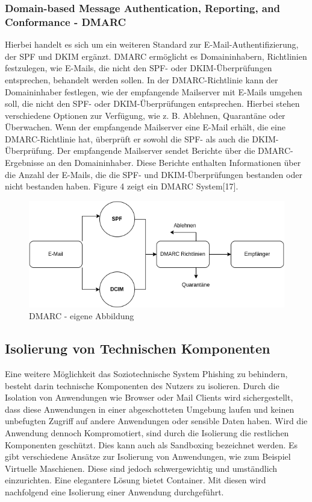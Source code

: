 \documentclass[journal=tosc,final]{iacrtrans}
\begin{document}
 \subsubsection{Domain-based Message Authentication, Reporting, and Conformance - DMARC}
 Hierbei handelt es sich um ein weiteren Standard zur E-Mail-Authentifizierung, der SPF und DKIM ergänzt. DMARC ermöglicht es Domaininhabern, Richtlinien festzulegen, wie E-Mails, die nicht den SPF- oder DKIM-Überprüfungen entsprechen, behandelt werden sollen. In der DMARC-Richtlinie kann der Domaininhaber festlegen, wie der empfangende Mailserver mit E-Mails umgehen soll, die nicht den SPF- oder DKIM-Überprüfungen entsprechen. Hierbei stehen verschiedene Optionen zur Verfügung, wie z. B. Ablehnen, Quarantäne oder Überwachen. Wenn der empfangende Mailserver eine E-Mail erhält, die eine DMARC-Richtlinie hat, überprüft er sowohl die SPF- als auch die DKIM-Überprüfung. Der empfangende Mailserver sendet Berichte über die DMARC-Ergebnisse an den Domaininhaber. Diese Berichte enthalten Informationen über die Anzahl der E-Mails, die die SPF- und DKIM-Überprüfungen bestanden oder nicht bestanden haben. Figure 4 zeigt ein DMARC System[17].
 \begin{figure}[h]
  \caption{DMARC - eigene Abbildung}
  \centering \includegraphics[scale=0.5]{dmarc.png}
 \end{figure}
\newpage
\subsection{Isolierung von Technischen Komponenten}
Eine weitere Möglichkeit das Soziotechnische System Phishing zu behindern, besteht darin technische Komponenten des Nutzers zu isolieren. Durch die Isolation von Anwendungen wie Browser oder Mail Clients wird sichergestellt, dass diese Anwendungen in einer abgeschotteten Umgebung laufen und keinen unbefugten Zugriff auf andere Anwendungen oder sensible Daten haben. Wird die Anwendung dennoch Kompromotiert, sind durch die Isolierung die restlichen Komponenten geschützt. Dies kann auch als Sandboxing bezeichnet werden. Es gibt verschiedene Ansätze zur Isolierung von Anwendungen, wie zum Beispiel Virtuelle Maschienen. Diese sind jedoch schwergewichtig und umständlich einzurichten. Eine elegantere Lösung bietet Container. Mit diesen wird nachfolgend eine Isolierung einer Anwendung durchgeführt. 
\end{document}
